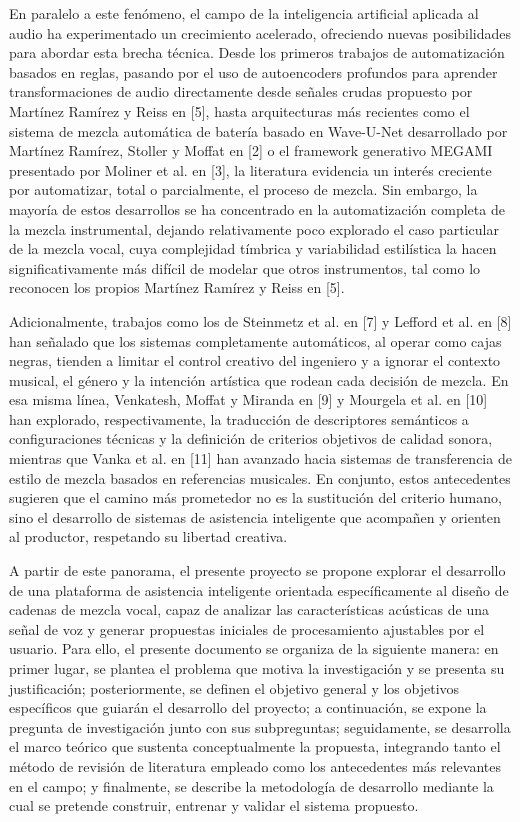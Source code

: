En paralelo a este fenómeno, el campo de la inteligencia artificial aplicada al audio ha experimentado un crecimiento acelerado, ofreciendo nuevas posibilidades para abordar esta brecha técnica. Desde los primeros trabajos de automatización basados en reglas, pasando por el uso de autoencoders profundos para aprender transformaciones de audio directamente desde señales crudas propuesto por Martínez Ramírez y Reiss en [5], hasta arquitecturas más recientes como el sistema de mezcla automática de batería basado en Wave-U-Net desarrollado por Martínez Ramírez, Stoller y Moffat en [2] o el framework generativo MEGAMI presentado por Moliner et al. en [3], la literatura evidencia un interés creciente por automatizar, total o parcialmente, el proceso de mezcla. Sin embargo, la mayoría de estos desarrollos se ha concentrado en la automatización completa de la mezcla instrumental, dejando relativamente poco explorado el caso particular de la mezcla vocal, cuya complejidad tímbrica y variabilidad estilística la hacen significativamente más difícil de modelar que otros instrumentos, tal como lo reconocen los propios Martínez Ramírez y Reiss en [5].

Adicionalmente, trabajos como los de Steinmetz et al. en [7] y Lefford et al. en [8] han señalado que los sistemas completamente automáticos, al operar como cajas negras, tienden a limitar el control creativo del ingeniero y a ignorar el contexto musical, el género y la intención artística que rodean cada decisión de mezcla. En esa misma línea, Venkatesh, Moffat y Miranda en [9] y Mourgela et al. en [10] han explorado, respectivamente, la traducción de descriptores semánticos a configuraciones técnicas y la definición de criterios objetivos de calidad sonora, mientras que Vanka et al. en [11] han avanzado hacia sistemas de transferencia de estilo de mezcla basados en referencias musicales. En conjunto, estos antecedentes sugieren que el camino más prometedor no es la sustitución del criterio humano, sino el desarrollo de sistemas de asistencia inteligente que acompañen y orienten al productor, respetando su libertad creativa.

A partir de este panorama, el presente proyecto se propone explorar el desarrollo de una plataforma de asistencia inteligente orientada específicamente al diseño de cadenas de mezcla vocal, capaz de analizar las características acústicas de una señal de voz y generar propuestas iniciales de procesamiento ajustables por el usuario. Para ello, el presente documento se organiza de la siguiente manera: en primer lugar, se plantea el problema que motiva la investigación y se presenta su justificación; posteriormente, se definen el objetivo general y los objetivos específicos que guiarán el desarrollo del proyecto; a continuación, se expone la pregunta de investigación junto con sus subpreguntas; seguidamente, se desarrolla el marco teórico que sustenta conceptualmente la propuesta, integrando tanto el método de revisión de literatura empleado como los antecedentes más relevantes en el campo; y finalmente, se describe la metodología de desarrollo mediante la cual se pretende construir, entrenar y validar el sistema propuesto.


